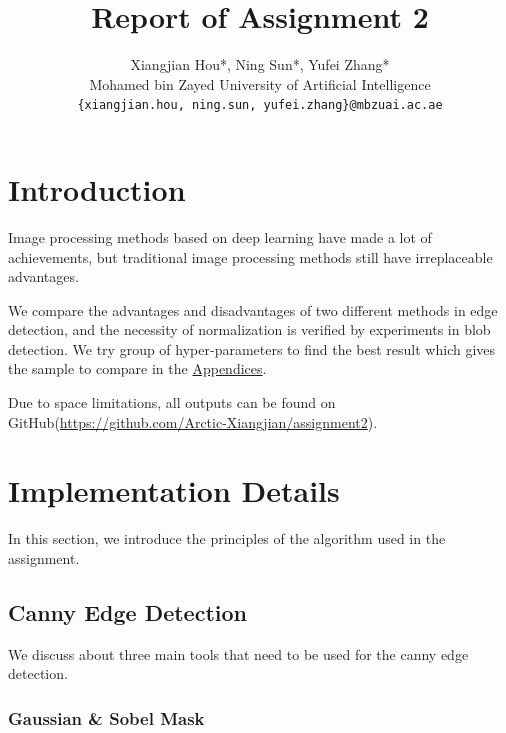 \documentclass[final]{cvpr}
\begin{document}
\title{Report of Assignment 2}

\author{Xiangjian Hou*, Ning Sun*, Yufei Zhang*\\
Mohamed bin Zayed University of Artificial Intelligence\\
{\tt\small \{xiangjian.hou, ning.sun, yufei.zhang\}@mbzuai.ac.ae}
}

\maketitle



\section{Introduction}
Image processing methods based on deep learning have made a lot of achievements, but traditional image processing methods still have irreplaceable advantages.

We compare the advantages and disadvantages of two different methods in edge detection, and the necessity of normalization is verified by experiments in blob detection. We try group of hyper-parameters to find the best result which gives the sample to compare in the \hyperref[append]{Appendices}. 

Due to space limitations, all outputs can be found on GitHub(\href{https://github.com/Arctic-Xiangjian/assignment2}{https://github.com/Arctic-Xiangjian/assignment2}).


\section{Implementation Details}

In this section, we introduce the principles of the algorithm used in the assignment.
\subsection{Canny Edge Detection}
We discuss about three main tools that need to be used for the canny edge detection.


\subsubsection{Gaussian \& Sobel Mask}
\end{document}
